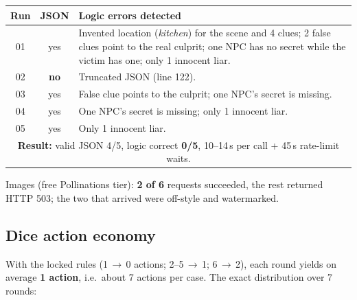 \documentclass[11pt,a4paper]{article}
\begin{document}
\begin{center}
\renewcommand{\arraystretch}{1.15}
\begin{tabularx}{\linewidth}{c c X}
\toprule
\textbf{Run} & \textbf{JSON} & \textbf{Logic errors detected} \\
\midrule
01 & yes & Invented location (\emph{kitchen}) for the scene and 4 clues; 2 false clues point to the
real culprit; one NPC has no secret while the victim has one; only 1 innocent liar. \\
02 & \textbf{no} & Truncated JSON (line 122). \\
03 & yes & False clue points to the culprit; one NPC's secret is missing. \\
04 & yes & One NPC's secret is missing; only 1 innocent liar. \\
05 & yes & Only 1 innocent liar. \\
\midrule
\multicolumn{3}{p{0.94\linewidth}}{\textbf{Result:} valid JSON 4/5, logic correct \textbf{0/5},
10--14\,s per call + 45\,s rate-limit waits.} \\
\bottomrule
\end{tabularx}
\end{center}

Images (free Pollinations tier): \textbf{2 of 6} requests succeeded, the rest returned HTTP 503; the
two that arrived were off-style and watermarked.

\subsection{Dice action economy}

With the locked rules (1\,$\to$\,0 actions; 2--5\,$\to$\,1; 6\,$\to$\,2), each round yields on average
\textbf{1 action}, i.e.\ about 7 actions per case. The exact distribution over 7 rounds:

\begin{center}
\end{center}
\end{document}

